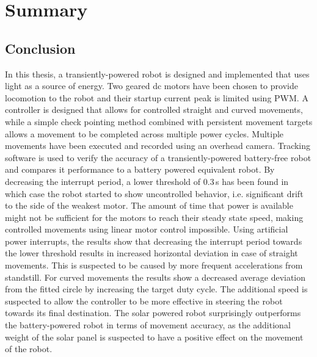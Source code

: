 \chapter{Summary}
\label{chp:summary}


\section{Conclusion}
\label{sec:conclusion}

In this thesis, a transiently-powered robot is designed and implemented that uses light as a source of energy.
Two geared dc motors have been chosen to provide locomotion to the robot and their startup current peak is limited using PWM.
A controller is designed that allows for controlled straight and curved movements, while a simple check pointing method combined with persistent movement targets allows a movement to be completed across multiple power cycles.
Multiple movements have been executed and recorded using an overhead camera.
Tracking software is used to verify the accuracy of a transiently-powered battery-free robot and compares it performance to a battery powered equivalent robot.
By decreasing the interrupt period, a lower threshold of 0.3\,s has been found in which case the robot started to show uncontrolled behavior, i.e. significant drift to the side of the weakest motor.
The amount of time that power is available might not be sufficient for the motors to reach their steady state speed, making controlled movements using linear motor control impossible.
Using artificial power interrupts, the results show that decreasing the interrupt period towards the lower threshold results in increased horizontal deviation in case of straight movements.
This is suspected to be caused by more frequent accelerations from standstill.
For curved movements the results show a decreased average deviation from the fitted circle by increasing the target duty cycle.
The additional speed is suspected to allow the controller to be more effective in steering the robot towards its final destination.
The solar powered robot surprisingly outperforms the battery-powered robot in terms of movement accuracy, as the additional weight of the solar panel is suspected to have a positive effect on the movement of the robot.


